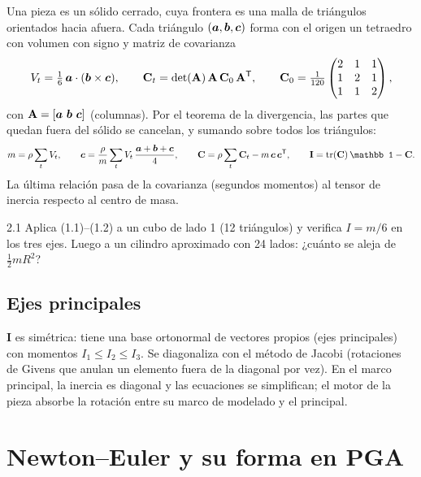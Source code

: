 \documentclass[11pt,a4paper]{article}
\begin{document}
Una pieza es un sólido cerrado, cuya frontera es una malla de triángulos orientados hacia afuera. Cada triángulo
$(\bm{a},\bm{b},\bm{c})$ forma con el origen un tetraedro con volumen con signo y matriz de covarianza
\begin{equation}
  V_t = \tfrac16\,\bm{a}\cdot(\bm{b}\times\bm{c}),\qquad
  \mathbf{C}_t = \det(\mathbf{A})\,\mathbf{A}\,\mathbf{C}_0\,\mathbf{A}^{\mathsf T},\qquad
  \mathbf{C}_0 = \tfrac{1}{120}\begin{pmatrix}2&1&1\\1&2&1\\1&1&2\end{pmatrix},
\end{equation}
con $\mathbf A = [\bm{a}\ \bm{b}\ \bm{c}]$ (columnas). Por el teorema de la divergencia, las partes que quedan
fuera del sólido se cancelan, y sumando sobre todos los triángulos:
\begin{equation}
  m = \rho\sum_t V_t,\qquad \vect c = \frac{\rho}{m}\sum_t V_t\,\frac{\vect a+\vect b+\vect c}{4},\qquad
  \mathbf C = \rho\sum_t \mathbf C_t - m\,\vect c\,\vect c^{\mathsf T},\qquad \mathbf I = \operatorname{tr}(\mathbf C)\,\mathbb 1 - \mathbf C.
\end{equation}
La última relación pasa de la covarianza (segundos momentos) al tensor de inercia respecto al centro de masa.

\begin{ejercicio}{2.1}
Aplica (1.1)--(1.2) a un cubo de lado 1 (12 triángulos) y verifica $I = m/6$ en los tres ejes. Luego a un cilindro
aproximado con 24 lados: ¿cuánto se aleja de $\tfrac12 mR^2$?
\end{ejercicio}

\subsection{Ejes principales}
$\mathbf I$ es simétrica: tiene una base ortonormal de vectores propios (ejes principales) con momentos
$I_1\le I_2\le I_3$. Se diagonaliza con el método de Jacobi (rotaciones de Givens que anulan un elemento fuera de la
diagonal por vez). En el marco principal, la inercia es diagonal y las ecuaciones se simplifican; el motor de la
pieza absorbe la rotación entre su marco de modelado y el principal.

\section{Newton–Euler y su forma en PGA}
\end{document}
